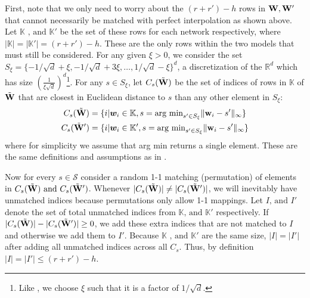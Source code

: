 First, note that we only need to worry about the $(r+r') - h$ rows in ${\mathbf{W}},{\mathbf{W'}}$ that cannot necessarily be matched with perfect interpolation as shown above. 
Let $\mathbb{K}\text{ , and } \mathbb{K}'$ be the set of these rows for each network respectively, where $|\mathbb{K}|=|\mathbb{K}'|=(r+r')-h$. These are the only rows within the two models that must still be considered. 
For any given $\xi>0$, we consider the set $S_\xi = \{-1/\sqrt{d}+\xi, -1/\sqrt{d}+3\xi,\ldots,1/\sqrt{d}-\xi\}^d$, a discretization of the $\mathbb{R}^{d}$ which has size $(\frac{1}{\xi\sqrt{d}})^d$\footnote{Like \cite{entezari2021role}, we choose $\xi$ such that it is a factor of $1/\sqrt{d}$.}. For any $s\in S_\xi$, let $C_s(\Tilde{{\mathbf{W}}})$ be the set of indices of rows in $\mathbb{K}$ of $\Tilde{{\mathbf{W}}}$ that are closest in Euclidean distance to $s$ than any other element in $S_\xi$:
\begin{align*}
    C_s(\Tilde{{\mathbf{W}}}) &= \{i|\bm{w}_i\in\mathbb{K}, s=\text{arg min}_{s'\in S_\xi} \lVert\mathbf{w}_i - s'\rVert_\infty\} \\
    C_s(\Tilde{{\mathbf{W}}}') &= \{i|\bm{w}_i\in\mathbb{K}', s=\text{arg min}_{s'\in S_\xi} \lVert\mathbf{w}_i - s'\rVert_\infty\}
\end{align*}
where for simplicity we assume that arg min returns a single element. 
These are the same definitions and assumptions as in \cite{entezari2021role}.

Now for every $s\in\mathcal{S}$ consider a random 1-1 matching (permutation) of elements in $C_s(\Tilde{{\mathbf{W}}})\text{ and }C_s(\Tilde{{\mathbf{W}}}')$.
Whenever $|C_s(\Tilde{{\mathbf{W}}})|\neq |C_s(\Tilde{{\mathbf{W}}}')|$, we will inevitably have unmatched indices because permutations only allow 1-1 mappings. Let $I\text{, and }I'$ denote the set of total unmatched indices from $\mathbb{K}\text{, and }\mathbb{K}'$ respectively. If $|C_s(\Tilde{{\mathbf{W}}})| - |C_s(\Tilde{{\mathbf{W}}}')| \geq 0$, we add these extra indices that are not matched to $I$ and otherwise we add them to $I'$. Because $\mathbb{K}\text{ , and } \mathbb{K}'$ are the same size, $|I|=|I'|$ after adding all unmatched indices across all $C_s$. 
Thus, by definition $|I|=|I'|\leq (r+r')-h$. 

